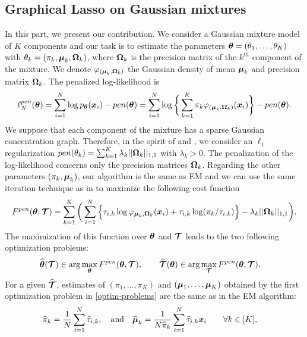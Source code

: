 \subsection{Graphical Lasso on Gaussian mixtures}
In this part, we present our contribution. We consider a Gaussian mixture model of $K$ components and our task is to estimate the parameters ${\boldsymbol\theta}=(\theta_1,\dots,\theta_K)$ with $\theta_k=(\pi_k, \boldsymbol\mu_k, \boldsymbol\Omega_k)$, where $\boldsymbol\Omega_k$ is the precision matrix of the $k^{th}$ component of the mixture. We denote $\varphi_{(\boldsymbol\mu_{k},\boldsymbol\Omega_{k})}$ the Gaussian density of mean $\boldsymbol\mu_k$ and precision matrix $\boldsymbol\Omega_k$. The penalized log-likelihood is
\begin{equation}
\label{pen-log-likelihood}
\ell_N^{pen}({\boldsymbol\theta})=\sum_{i=1}^{N}\log p_{{\boldsymbol\theta}}(\boldsymbol x_i)-pen({\boldsymbol\theta})= \sum_{i=1}^{N}\log \bigg\{ \sum_{k=1}^K\pi_k\varphi_{(\boldsymbol\mu_{k},\boldsymbol\Omega_{k})}(\boldsymbol x_i)\bigg\} -pen({\boldsymbol\theta}).
\end{equation}
We suppose that each component of the mixture has a sparse Gaussian concentration graph. Therefore, in the spirit of \citep{banerjee} and \citep{glasso07}, we consider an $\ell_1$ regularization $pen(\theta_k)=\sum_{k=1}^K\lambda_k||\boldsymbol\Omega_k||_{1,1}$ with $\lambda_k >0$. The penalization of the log-likelihood concerns only the precision matrices $\boldsymbol\Omega_k$. Regarding the other parameters $(\pi_k, \boldsymbol\mu_k)$, our algorithm is the same as EM and we can use the same iteration technique as in  to maximize the following cost function
\begin{equation}
\label{cost_fun_pen}
F^{pen}({\boldsymbol\theta},\boldsymbol{\mathcal T})  = \sum_{k=1}^K \bigg(\sum_{i=1}^{N} \Big\{\tau_{i,k}\log\varphi_{\boldsymbol\mu_{k},\boldsymbol\Omega_{k}}(\boldsymbol x_i)+\tau_{i,k}
    \log(\pi_k/\tau_{i,k})\Big\}-\lambda_k||\boldsymbol\Omega_k||_{1,1}\bigg).
\end{equation}
The maximization of this function over ${\boldsymbol\theta}$ and $\boldsymbol{\mathcal T}$ leads to the two following optimization problems:
\begin{align}
\label{optim-problems}
\widehat{{\boldsymbol\theta}}(\boldsymbol{\mathcal T})&\in \arg\max_{{\boldsymbol\theta}} F^{pen}({\boldsymbol\theta},\boldsymbol{\mathcal T}),\qquad \widehat{\boldsymbol{\mathcal T}}({\boldsymbol\theta})\in \arg\max_{\boldsymbol{\mathcal T}} F^{pen}({\boldsymbol\theta},\boldsymbol{\mathcal T}).
\end{align}
For a given $\widehat{\boldsymbol{\mathcal T}}$, estimates of $(\pi_1,\dots,\pi_K)$ and $(\boldsymbol\mu_1,\dots,\boldsymbol\mu_K)$ obtained by the first optimization problem in \cref{optim-problems} are the same as in the EM algorithm:
\begin{align}
\label{em-sols}
\widehat\pi_k     &= \frac1N\sum_{i=1}^N \widehat\tau_{i,k},\quad\text{and}\quad\widehat{\boldsymbol\mu}_k = \frac1{N\widehat\pi_k}\sum_{i=1}^N \widehat\tau_{i,k}\boldsymbol x_i \qquad \forall k\in[K],
\end{align}
